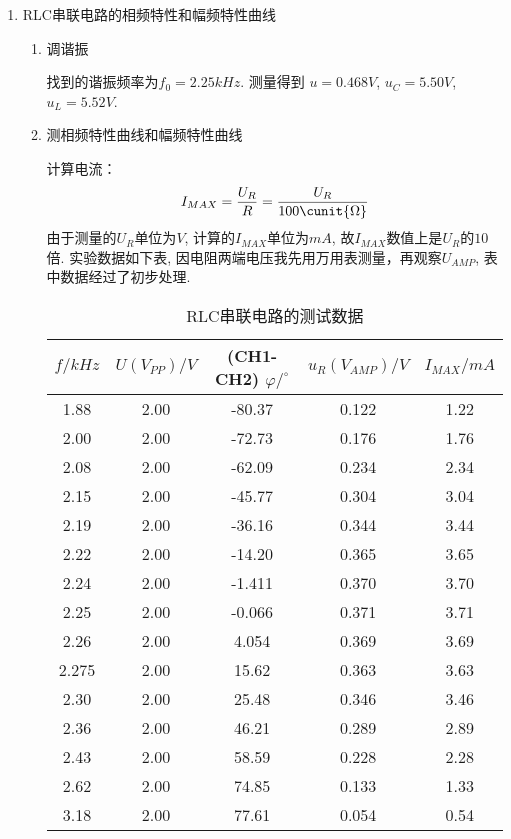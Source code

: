 \documentclass[11pt]{article}
\begin{document}
\begin{enumerate}

\item RLC串联电路的相频特性和幅频特性曲线

    \begin{enumerate}
    
    \item 调谐振
    
    找到的谐振频率为$f_0= 2.25\unit{kHz}$. 测量得到 $u = 0.468\unit{V}$, $u_C = 5.50\unit{V}$, $u_L  = 5.52\unit{V}$.

    \item 测相频特性曲线和幅频特性曲线
    
    计算电流：
    \[
        I_{MAX} = \frac{U_R}{R} =  \frac{U_R}{100\cunit{\Omega}}
    \]
    由于测量的$U_R$单位为$\unit{V}$, 计算的$I_{MAX}$单位为$\unit{mA}$, 故$I_{MAX}$数值上是$U_R$的$10$倍. 实验数据如下表, 因电阻两端电压我先用万用表测量，再观察$U_{AMP}$, 表中数据经过了初步处理. 

    \begin{table}[H]
        \centering
        \caption{RLC串联电路的测试数据}
        \begin{tabular}{|c|c|c|c|c|}
            \hline
            $f/\unit{kHz}$&$U(V_{PP})/\unit{V}$&(CH1-CH2) $\varphi/^{\circ}$&$u_R(V_{AMP})/\unit{V}$&$I_{MAX}/\unit{mA}$\\
            \hline
            1.88&2.00&-80.37&0.122&1.22\\
            \hline
            2.00&2.00&-72.73&0.176&1.76\\
            \hline
            2.08&2.00&-62.09&0.234&2.34\\
            \hline
            2.15&2.00&-45.77&0.304&3.04\\
            \hline
            2.19&2.00&-36.16&0.344&3.44\\
            \hline
            2.22&2.00&-14.20&0.365&3.65\\
            \hline
            2.24&2.00&-1.411&0.370&3.70\\
            \hline
            2.25&2.00&-0.066&0.371&3.71\\
            \hline
            2.26&2.00&4.054&0.369&3.69\\
            \hline
            2.275&2.00&15.62&0.363&3.63\\
            \hline
            2.30&2.00&25.48&0.346&3.46\\
            \hline
            2.36&2.00&46.21&0.289&2.89\\
            \hline
            2.43&2.00&58.59&0.228&2.28\\
            \hline
            2.62&2.00&74.85&0.133&1.33\\
            \hline
            3.18&2.00&77.61&0.054&0.54\\
            \hline
        \end{tabular}
    \end{table}


\end{enumerate}
\end{enumerate}
\end{document}
